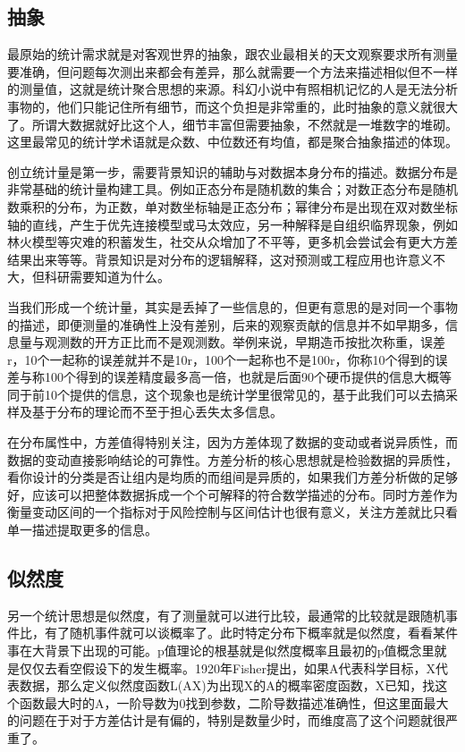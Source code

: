 \documentclass[]{tufte-book}
\begin{document}
\hypertarget{ux62bdux8c61}{%
\subsection{抽象}\label{ux62bdux8c61}}

最原始的统计需求就是对客观世界的抽象，跟农业最相关的天文观察要求所有测量要准确，但问题每次测出来都会有差异，那么就需要一个方法来描述相似但不一样的测量值，这就是统计聚合思想的来源。科幻小说中有照相机记忆的人是无法分析事物的，他们只能记住所有细节，而这个负担是非常重的，此时抽象的意义就很大了。所谓大数据就好比这个人，细节丰富但需要抽象，不然就是一堆数字的堆砌。这里最常见的统计学术语就是众数、中位数还有均值，都是聚合抽象描述的体现。

创立统计量是第一步，需要背景知识的辅助与对数据本身分布的描述。数据分布是非常基础的统计量构建工具。例如正态分布是随机数的集合；对数正态分布是随机数乘积的分布，为正数，单对数坐标轴是正态分布；幂律分布是出现在双对数坐标轴的直线，产生于优先连接模型或马太效应，另一种解释是自组织临界现象，例如林火模型等灾难的积蓄发生，社交从众增加了不平等，更多机会尝试会有更大方差结果出来等等。背景知识是对分布的逻辑解释，这对预测或工程应用也许意义不大，但科研需要知道为什么。

当我们形成一个统计量，其实是丢掉了一些信息的，但更有意思的是对同一个事物的描述，即便测量的准确性上没有差别，后来的观察贡献的信息并不如早期多，信息量与观测数的开方正比而不是观测数。举例来说，早期造币按批次称重，误差r，10个一起称的误差就并不是10r，100个一起称也不是100r，你称10个得到的误差与称100个得到的误差精度最多高一倍，也就是后面90个硬币提供的信息大概等同于前10个提供的信息，这个现象也是统计学里很常见的，基于此我们可以去搞采样及基于分布的理论而不至于担心丢失太多信息。

在分布属性中，方差值得特别关注，因为方差体现了数据的变动或者说异质性，而数据的变动直接影响结论的可靠性。方差分析的核心思想就是检验数据的异质性，看你设计的分类是否让组内是均质的而组间是异质的，如果我们方差分析做的足够好，应该可以把整体数据拆成一个个可解释的符合数学描述的分布。同时方差作为衡量变动区间的一个指标对于风险控制与区间估计也很有意义，关注方差就比只看单一描述提取更多的信息。

\hypertarget{ux4f3cux7136ux5ea6}{%
\subsection{似然度}\label{ux4f3cux7136ux5ea6}}

另一个统计思想是似然度，有了测量就可以进行比较，最通常的比较就是跟随机事件比，有了随机事件就可以谈概率了。此时特定分布下概率就是似然度，看看某件事在大背景下出现的可能。p值理论的根基就是似然度概率且最初的p值概念里就是仅仅去看空假设下的发生概率。1920年Fisher提出，如果A代表科学目标，X代表数据，那么定义似然度函数L(A\textbar X)为出现X的A的概率密度函数，X已知，找这个函数最大时的A，一阶导数为0找到参数，二阶导数描述准确性，但这里面最大的问题在于对于方差估计是有偏的，特别是数量少时，而维度高了这个问题就很严重了。
\end{document}
